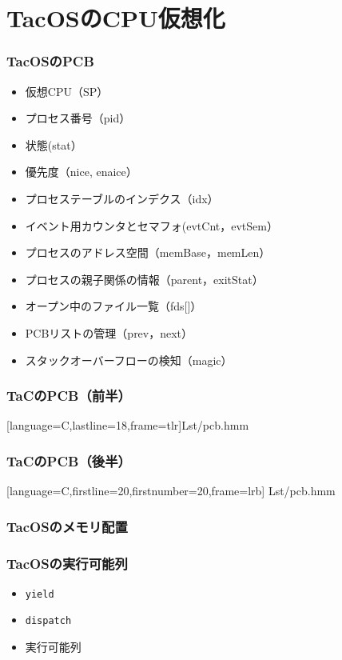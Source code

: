 \documentclass{beamer}                   %
\begin{document}
\section{TacOSのCPU仮想化}
\begin{frame}
  \frametitle{TacOSのPCB}
  \begin{itemize}
    \item 仮想CPU（SP）
    \item プロセス番号（pid）
    \item 状態(stat）
    \item 優先度（nice, enaice）
    \item プロセステーブルのインデクス（idx）
    \item イベント用カウンタとセマフォ(evtCnt，evtSem）
    \item プロセスのアドレス空間（memBase，memLen）
    \item プロセスの親子関係の情報（parent，exitStat）
    \item オープン中のファイル一覧（fds[]）
    \item PCBリストの管理（prev，next）
    \item スタックオーバーフローの検知（magic）
  \end{itemize}
\end{frame}

\begin{frame}[fragile]
  \frametitle{TaCのPCB（前半）}
  
      [language={C},lastline=18,frame=tlr]{Lst/pcb.hmm}
\end{frame}

\begin{frame}[fragile]
  \frametitle{TaCのPCB（後半）}
  
      [language={C},firstline=20,firstnumber=20,frame=lrb]
      {Lst/pcb.hmm}
\end{frame}

\begin{frame}
  \frametitle{TacOSのメモリ配置}
\end{frame}

\begin{frame}
  \frametitle{TacOSの実行可能列}
  \begin{itemize}
    \item {\tt yield}
    \item {\tt dispatch}
    \item 実行可能列
  \end{itemize}
\end{frame}
\end{document}
